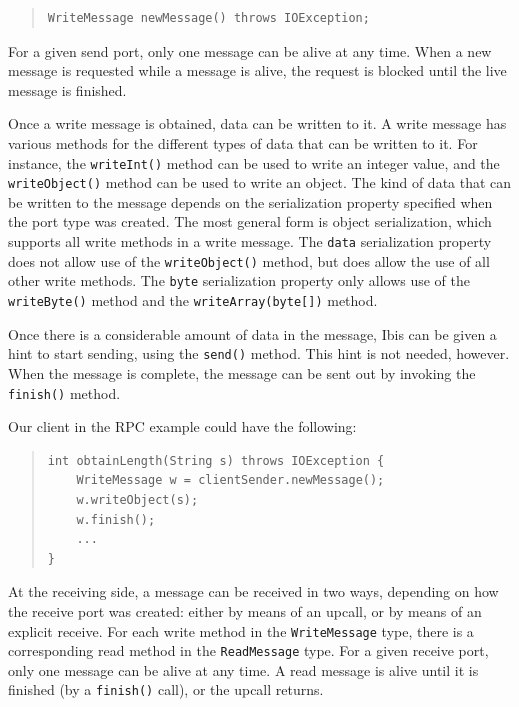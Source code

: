 \documentclass[10pt]{article}
\begin{document}
\begin{quote}
\begin{verbatim}
WriteMessage newMessage() throws IOException;
\end{verbatim}
\end{quote}

\noindent
For a given send port, only one message can be alive at any time.
When a new message is requested while a message is alive, the request
is blocked until the live message is finished.

Once a write message is obtained, data can be written to it.
A write message has various methods for the different types of
data that can be written to it. For instance, the
\texttt{writeInt()} method can be used to write an integer value,
and the \texttt{writeObject()} method can be used to write an object.
The kind of data that can be written to the message depends on the
serialization property specified when the port type was created.
The most general form is object serialization, which supports 
all write methods in a write message.
The \texttt{data} serialization property does not allow use of the
\texttt{writeObject()} method, but does allow the use of all other write
methods. The \texttt{byte} serialization property only allows use
of the \texttt{writeByte()} method and the \texttt{writeArray(byte[])}
method.

Once there is a considerable amount of data in the message, Ibis
can be given a hint to start sending, using the \texttt{send()}
method. This hint is not needed, however. When the message is
complete, the message can be sent out by invoking the
\texttt{finish()} method.

Our client in the RPC example could have the following:
\begin{quote}
\begin{verbatim}
int obtainLength(String s) throws IOException {
    WriteMessage w = clientSender.newMessage();
    w.writeObject(s);
    w.finish();
    ...
}
\end{verbatim}
\end{quote}

\noindent
At the receiving side, a message can be received in two ways,
depending on how the receive port was created: either by means of an
upcall, or by means of an explicit receive. For each write method
in the \texttt{WriteMessage} type, there is a corresponding read method in
the \texttt{ReadMessage} type. For a given receive port, only one message can
be alive at any time. A read message is alive until it is
finished (by a \texttt{finish()} call), or the upcall returns.
\end{document}
